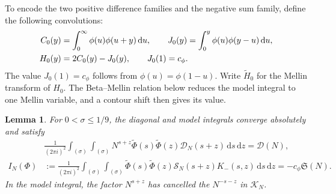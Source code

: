 \documentclass[12pt,a4paper]{amsart}
\numberwithin{equation}{section}
\def\d{\,{\rm d}}
\def\le{\leqslant}
\theoremstyle{plain}
\newtheorem{lemma}[proposition]{Lemma}
\theoremstyle{definition}
\theoremstyle{remark}
\begin{document}
To encode the two positive difference families and the negative
sum family, define the following convolutions:
\begin{equation}\label{gb:convolutions}
 \begin{aligned}
 C_0(y)&=\int_0^\infty\phi(u)\phi(u+y)\d u,\qquad
 J_0(y)=\int_0^y\phi(u)\phi(y-u)\d u,\\
 H_0(y)&=2C_0(y)-J_0(y),\qquad J_0(1)=c_\phi.
 \end{aligned}
\end{equation}
The value $J_0(1)=c_\phi$ follows from $\phi(u)=\phi(1-u)$.
Write $\widetilde H_0$ for the Mellin transform of $H_0$.
The Beta--Mellin relation below reduces the model integral to one
Mellin variable, and a contour shift then gives its value.

\begin{lemma}\label{proof:gb:main-term-inversion}
For $0<\sigma\le1/9$, the diagonal and model integrals converge
absolutely and satisfy
\begin{align}
 &\frac1{(2\pi i)^2}\int_{(\sigma)}\int_{(\sigma)}
 N^{s+z}\widetilde\Phi(s)\widetilde\Phi(z)
                         \mathscr D_N(s+z)\,\mathrm{d}s\,\mathrm{d}z=\mathcal D(N),
                         \label{proof:gb:diagonal-inversion}\\
 I_N(\Phi)&:=\frac1{(2\pi i)^2}\int_{(\sigma)}\int_{(\sigma)}
 \widetilde\Phi(s)\widetilde\Phi(z)
                 \mathscr S_N(s+z)K_-(s,z)\,\mathrm{d}s\,\mathrm{d}z
                 =-c_\phi\mathfrak S(N).
                 \label{proof:gb:beta-inversion}
\end{align}
In the model integral, the factor $N^{s+z}$ has cancelled the
$N^{-s-z}$ in $\mathscr K_N$.
\end{lemma}
\end{document}
